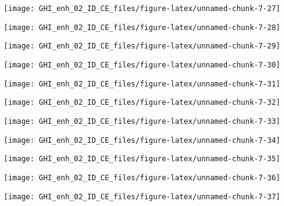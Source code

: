 \documentclass[
  10pt,
  a4paper,oneside]{article}
\begin{document}
\begin{center}\texttt{[image: GHI\_enh\_02\_ID\_CE\_files/figure-latex/unnamed-chunk-7-27]} \end{center}

\begin{center}\texttt{[image: GHI\_enh\_02\_ID\_CE\_files/figure-latex/unnamed-chunk-7-28]} \end{center}

\begin{center}\texttt{[image: GHI\_enh\_02\_ID\_CE\_files/figure-latex/unnamed-chunk-7-29]} \end{center}

\begin{center}\texttt{[image: GHI\_enh\_02\_ID\_CE\_files/figure-latex/unnamed-chunk-7-30]} \end{center}

\begin{center}\texttt{[image: GHI\_enh\_02\_ID\_CE\_files/figure-latex/unnamed-chunk-7-31]} \end{center}

\begin{center}\texttt{[image: GHI\_enh\_02\_ID\_CE\_files/figure-latex/unnamed-chunk-7-32]} \end{center}

\begin{center}\texttt{[image: GHI\_enh\_02\_ID\_CE\_files/figure-latex/unnamed-chunk-7-33]} \end{center}

\begin{center}\texttt{[image: GHI\_enh\_02\_ID\_CE\_files/figure-latex/unnamed-chunk-7-34]} \end{center}

\begin{center}\texttt{[image: GHI\_enh\_02\_ID\_CE\_files/figure-latex/unnamed-chunk-7-35]} \end{center}

\begin{center}\texttt{[image: GHI\_enh\_02\_ID\_CE\_files/figure-latex/unnamed-chunk-7-36]} \end{center}

\begin{center}\texttt{[image: GHI\_enh\_02\_ID\_CE\_files/figure-latex/unnamed-chunk-7-37]} \end{center}
\end{document}

